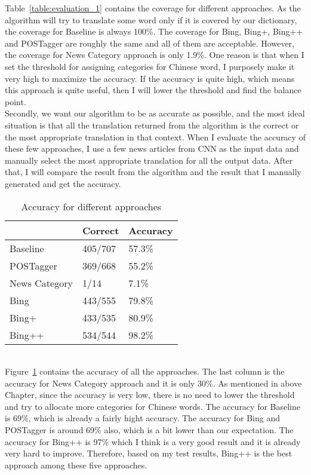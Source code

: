 Table~\ref{table:evaluation_1} contains the coverage for different approaches. As the algorithm will try to translate some word only if it is covered by our dictionary, the coverage for Baseline is always 100\%. The coverage for Bing, Bing+, Bing++ and POSTagger are roughly the same and all of them are acceptable. However, the coverage for News Category approach is only 1.9\%. One reason is that when I set the threshold for assigning categories for Chinese word, I purposely make it very high to maximize the accuracy. If the accuracy is quite high, which means this approach is quite useful, then I will lower the threshold and find the balance point.
\\
Secondly, we want our algorithm to be as accurate as possible, and the most ideal situation is that all the translation returned from the algorithm is the correct or the most appropriate translation in that context. When I evaluate the accuracy of these few approaches, I use a few news articles from CNN as the input data and manually select the most appropriate translation for all the output data. After that, I will compare the result from the algorithm and the result that I manually generated and get the accuracy.
\\
\begin{table}[ht]
  \caption{Accuracy for different approaches}
  \label{table:evaluation_3}
  \begin{tabular}{| p{2cm} | p{2cm} | p{2cm} |}
    \hline
     & Correct & Accuracy\\
    \hline
    Baseline & 405/707 & 57.3\%\\
    \hline
    POSTagger & 369/668 & 55.2\%\\
    \hline
    News Category & 1/14 & 7.1\%\\
    \hline
    Bing & 443/555 & 79.8\%\\
    \hline
    Bing+ & 433/535 & 80.9\%\\
    \hline
    Bing++ & 534/544 & 98.2\%\\
    \hline
  \end{tabular}
\end{table}
\\
Figure~\ref{table:evaluation_3} contains the accuracy of all the approaches. The last column is the accuracy for News Category approach and it is only 30\%. As mentioned in above Chapter, since the accuracy is very low, there is no need to lower the threshold and try to allocate more categories for Chinese words. The accuracy for Baseline is 69\%, which is already a fairly hight accuracy. The accuracy for Bing and POSTagger is around 69\% also, which is a bit lower than our expectation. The accuracy for Bing++ is 97\% which I think is a very good result and it is already very hard to improve. Therefore, based on my test results, Bing++ is the best approach among these five approaches.
\\